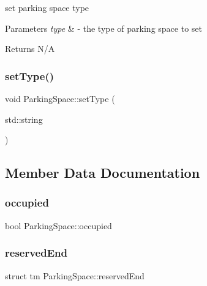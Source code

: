 set parking space type 


\begin{DoxyParams}{Parameters}
{\em type} & -\/ the type of parking space to set \\
\hline
\end{DoxyParams}
\begin{DoxyReturn}{Returns}
N/A 
\end{DoxyReturn}
\mbox{\label{class_parking_space_a4abd727d17e2045ef0617fb68e8135ed}} 
\subsubsection{\texorpdfstring{set\+Type()}{setType()}\hspace{0.1cm}{\footnotesize\ttfamily [2/2]}}
{\footnotesize\ttfamily void Parking\+Space\+::set\+Type (\begin{DoxyParamCaption}\item[{std\+::string}]{ }\end{DoxyParamCaption})}



\subsection{Member Data Documentation}
\mbox{\label{class_parking_space_a296bd26740e110c847c9aa423fec4822}} 
\subsubsection{\texorpdfstring{occupied}{occupied}}
{\footnotesize\ttfamily bool Parking\+Space\+::occupied\hspace{0.3cm}{\ttfamily [private]}}

\mbox{\label{class_parking_space_a7bb127221ad5cf6ccfd2ef554efee206}} 
\subsubsection{\texorpdfstring{reserved\+End}{reservedEnd}}
{\footnotesize\ttfamily struct tm Parking\+Space\+::reserved\+End\hspace{0.3cm}{\ttfamily [private]}}

